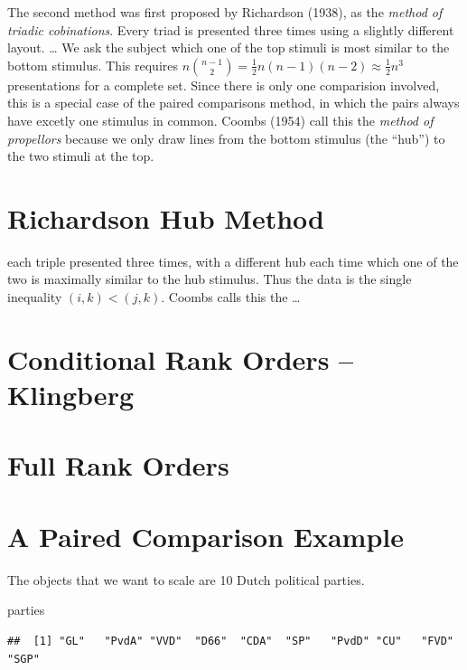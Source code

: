 \documentclass[
  12pt,
]{article}
\newenvironment{Shaded}{\begin{snugshade}}{\end{snugshade}}
\newcommand{\NormalTok}[1]{#1}
\begin{document}
The second method was first proposed by Richardson (1938),
as the \emph{method of triadic cobinations}. Every triad is presented three times using a slightly different layout.
\ldots{}
We ask the subject which one of the top stimuli is most similar to the bottom stimulus. This requires
\(n\binom{n-1}{2}=\frac12n(n-1)(n-2)\approx\frac12n^3\)
presentations for a complete set. Since there is only
one comparision involved, this is a special case of
the paired comparisons method, in which the pairs always
have excetly one stimulus in common. Coombs (1954) call this the \emph{method of propellors} because we only draw lines
from the bottom stimulus (the ``hub'') to the two stimuli
at the top.

\section{Richardson Hub Method}\label{richardson-hub-method}

each triple presented three times, with a different hub each time
which one of the two is maximally similar to the hub stimulus. Thus the data
is the single inequality \((i,k) < (j,k)\). Coombs calls this the \ldots{}

\section{Conditional Rank Orders -- Klingberg}\label{conditional-rank-orders-klingberg}

\section{Full Rank Orders}\label{full-rank-orders}

\section{A Paired Comparison Example}\label{a-paired-comparison-example}

The objects that we want to scale are 10 Dutch political parties.

\begin{Shaded}
\begin{Highlighting}[]
\NormalTok{parties}
\end{Highlighting}
\end{Shaded}

\begin{verbatim}
##  [1] "GL"   "PvdA" "VVD"  "D66"  "CDA"  "SP"   "PvdD" "CU"   "FVD"  "SGP"
\end{verbatim}
\end{document}
